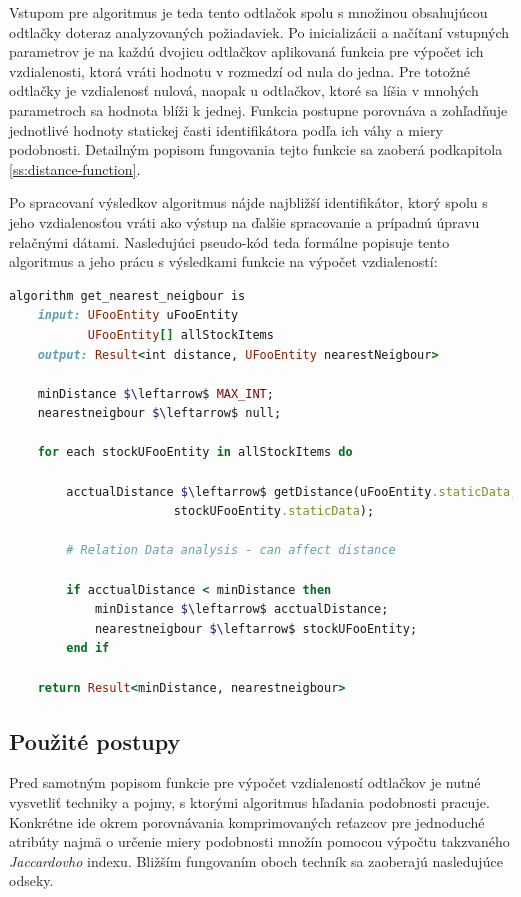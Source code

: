 \documentclass[
  printed, %
  table,   %
  lof,     %
  nolot,   %
  nocover
]{fithesis3}
\begin{document}
Vstupom pre algoritmus je teda tento odtlačok
spolu s množinou obsahujúcou odtlačky doteraz analyzovaných požiadaviek.
Po
inicializácii a načítaní vstupných parametrov je na každú dvojicu odtlačkov
aplikovaná funkcia pre výpočet ich vzdialenosti, ktorá vráti hodnotu v rozmedzí
od nula do jedna. Pre totožné odtlačky je vzdialenosť nulová, naopak u
odtlačkov, ktoré sa líšia v mnohých parametroch sa hodnota blíži k jednej.
Funkcia postupne porovnáva a zohľadňuje jednotlivé hodnoty statickej časti
identifikátora podľa ich váhy a miery podobnosti. Detailným popisom fungovania
tejto funkcie sa zaoberá podkapitola \ref{ss:distance-function}. 

Po spracovaní
výsledkov algoritmus nájde najbližší identifikátor, ktorý spolu s jeho
vzdialenosťou vráti ako výstup na ďalšie spracovanie a prípadnú úpravu
relačnými dátami.
Nasledujúci pseudo-kód teda formálne popisuje tento algoritmus a jeho prácu s
výsledkami funkcie na výpočet vzdialeností:
\begin{lstlisting}[basicstyle=\footnotesize, language=Ruby, mathescape]
algorithm get_nearest_neigbour is
    input: UFooEntity uFooEntity
           UFooEntity[] allStockItems
    output: Result<int distance, UFooEntity nearestNeigbour>

    minDistance $\leftarrow$ MAX_INT;
    nearestneigbour $\leftarrow$ null;

    for each stockUFooEntity in allStockItems do

        acctualDistance $\leftarrow$ getDistance(uFooEntity.staticData,
                       stockUFooEntity.staticData);

        # Relation Data analysis - can affect distance 

        if acctualDistance < minDistance then
            minDistance $\leftarrow$ acctualDistance;
            nearestneigbour $\leftarrow$ stockUFooEntity;
        end if
    
    return Result<minDistance, nearestneigbour>
\end{lstlisting}

\subsection{Použité postupy}
Pred samotným popisom funkcie pre výpočet vzdialeností odtlačkov je nutné
vysvetliť techniky a pojmy, s ktorými algoritmus hľadania podobnosti pracuje. 
Konkrétne ide
okrem porovnávania komprimovaných reťazcov pre jednoduché atribúty najmä o 
určenie miery podobnosti množín pomocou výpočtu takzvaného
\textit{Jaccardovho} indexu. Bližším fungovaním oboch techník sa zaoberajú nasledujúce odseky.
\end{document}
